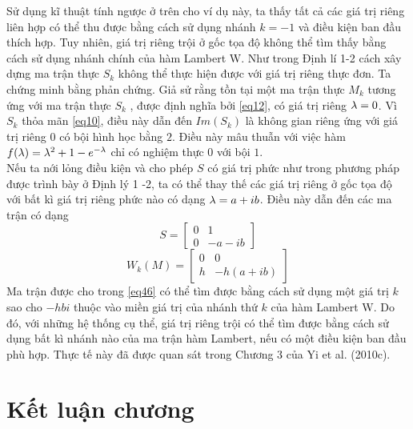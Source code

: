 Sử dụng kĩ thuật tính ngược ở trên cho ví dụ này, ta thấy tất cả các giá trị riêng liên hợp có thể thu được bằng cách sử dụng nhánh $k = -1$ và điều kiện ban đầu thích hợp. Tuy nhiên, giá trị riêng trội ở gốc tọa độ không thể tìm thấy bằng cách sử dụng nhánh chính của hàm Lambert W. Như trong Định lí 1-2 cách xây dựng ma trận thực $S_k$ không thể thực hiện được với giá trị riêng thực đơn. Ta chứng minh bằng phản chứng. Giả sử rằng tồn tại một ma trận thực $M_k$ tương ứng với ma trận thực $S_k$ , được định nghĩa bởi \eqref{eq12}, có giá trị riêng $\lambda = 0$. Vì $S_k$ thỏa mãn \eqref{eq10}, điều này dẫn đến $Im(S_k)$ là không gian riêng ứng với giá trị riêng $0$ có bội hình học bằng $2$. Điều này mâu thuẫn với việc hàm $f(\lambda) = \lambda^2 + 1 - e^{-\lambda}$ chỉ có nghiệm thực $0$ với bội $1$.\\
Nếu ta nới lỏng điều kiện và cho phép $S$ có giá trị phức như trong phương pháp được trình bày ở Định lý 1 -2, ta có thể thay thế các giá trị riêng ở gốc tọa độ với bất kì giá trị riêng phức nào có dạng $\lambda = a + ib$. Điều này dẫn đến các ma trận có dạng
\begin{equation}\label{eq45}
	S = \begin{bmatrix}
		0 & 1\\
		0 & - a - ib
	\end{bmatrix}
\end{equation}
\begin{equation}\label{eq46}
	W_k(M) = \begin{bmatrix}
		0 & 0\\
		h  & -h (a+ib)
	\end{bmatrix}
\end{equation}
Ma trận được cho trong \eqref{eq46} có thể tìm được bằng cách sử dụng một giá trị $k$ sao cho $-h  bi$ thuộc vào miền giá trị của nhánh thứ $k$ của hàm Lambert W. Do đó, với những hệ thống cụ thể, giá trị riêng trội có thể tìm được bằng cách sử dụng bất kì nhánh nào của ma trận hàm Lambert, nếu có một điều kiện ban đầu phù hợp. Thực tế này đã được quan sát trong Chương 3 của Yi et al. (2010c).

\section{Kết luận chương}


